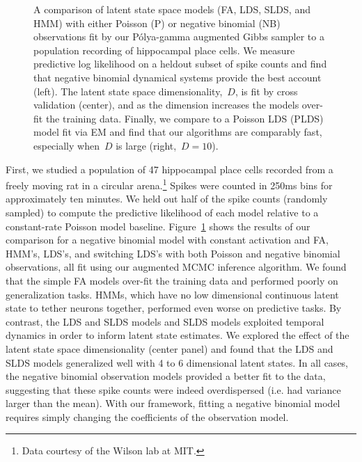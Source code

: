 \begin{figure}
\begin{subfigure}[t]{\textwidth}
  \end{subfigure}
  \vspace{-1em}
  \caption[Comparison of state space models on hippocampal data]
  {A comparison of latent state space models (FA, LDS, SLDS,
    and HMM) with either Poisson (P) or negative binomial (NB)
    observations fit by our P\'{o}lya-gamma augmented Gibbs sampler to
    a population recording of hippocampal place cells. We measure
    predictive log likelihood on a heldout subset of spike counts and
    find that negative binomial dynamical systems provide the best
    account (left). The latent state space dimensionality,~$D$, is fit
    by cross validation (center), and as the dimension increases the
    models over-fit the training data. Finally, we compare to a
    Poisson LDS (PLDS) model fit via EM and find that our algorithms
    are comparably fast, especially when~$D$ is large
    (right,~$D=10$).}
  \label{fig:hipp8}
\end{figure}


First, we studied a population of 47 hippocampal place cells recorded from a freely moving rat in a 
circular arena.\footnote{Data courtesy of the Wilson lab at MIT.} Spikes were counted in 
250ms bins for approximately ten minutes.
 We held out half of the spike counts (randomly sampled) to compute the predictive 
likelihood of each model relative to a constant-rate Poisson model baseline. 
Figure~\ref{fig:hipp8} shows the results of our comparison for a negative binomial model with constant 
activation and FA, HMM's, LDS's, and switching LDS's with both Poisson and negative binomial observations,
all fit using our augmented MCMC inference algorithm.  We found that the simple FA models over-fit the 
training data and performed poorly on generalization tasks. HMMs, which 
have no low dimensional continuous latent state to tether neurons together, 
performed even worse on predictive tasks. By contrast, the LDS and SLDS 
models and SLDS models exploited temporal dynamics in order to inform latent state estimates.
We explored the effect of the latent state space dimensionality (center panel) and found that 
the LDS and SLDS models generalized well with 4 to 6 dimensional latent states. 
In all cases, the negative binomial 
observation models provided a better fit to the data, suggesting that these 
spike counts were indeed overdispersed (i.e. had variance larger than the mean). With 
our framework, fitting a negative binomial model requires simply changing the 
coefficients of the observation model.

